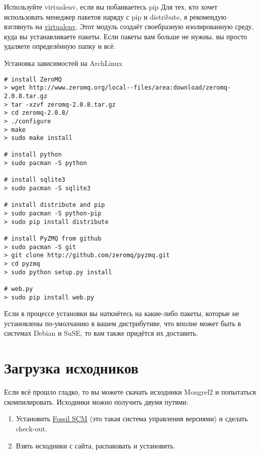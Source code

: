 \begin{aside}{Используйте virtualenv, если вы побаиваетесь pip}
Для тех, кто хочет использовать менеджер пакетов наряду с pip и distribute,
я рекомендую взглянуть на \href{http://pypi.python.org/pypi/virtualenv}{virtualenv}.
Этот модуль создаёт своебразную изолированную среду, куда вы устанавливаете пакеты.
Если пакеты вам больше не нужны, вы просто удаляете определённую папку и всё.
\end{aside}

\begin{code}{Установка зависимостей на ArchLinux}
\begin{lstlisting}
# install ZeroMQ
> wget http://www.zeromq.org/local--files/area:download/zeromq-2.0.8.tar.gz
> tar -xzvf zeromq-2.0.8.tar.gz
> cd zeromq-2.0.8/
> ./configure
> make
> sudo make install

# install python
> sudo pacman -S python

# install sqlite3
> sudo pacman -S sqlite3

# install distribute and pip
> sudo pacman -S python-pip
> sudo pip install distribute

# install PyZMQ from github
> sudo pacman -S git
> git clone http://github.com/zeromq/pyzmq.git
> cd pyzmq
> sudo python setup.py install

# web.py
> sudo pip install web.py
\end{lstlisting}
\end{code}

Если в процессе установки вы наткнётесь на какие-либо пакеты, которые
не установлены по-умолчанию в вашем дистрибутиве, что вполне может быть
в системах Debian и SuSE, то вам также придётся их доставить.

\section{Загрузка исходников}

Если всё прошло гладко, то вы можете скачать исходники Mongrel2 и
попытаться скомпилировать. Исходники можно получить двумя путями:

\begin{enumerate}
\item Установить \href{http://fossil-scm.org}{Fossil SCM} (это такая система управления версиями) и сделать check-out.
\item Взять исходники с сайта, распаковать и установить.
\end{enumerate}

